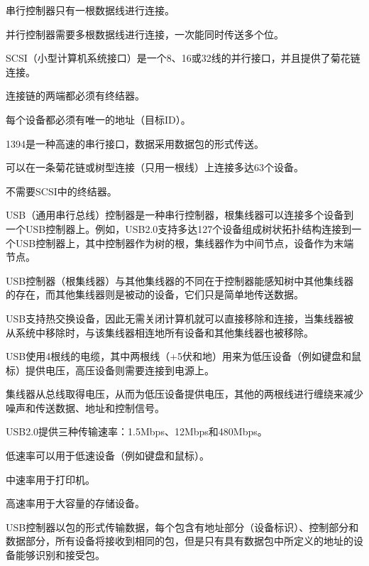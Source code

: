 \begin{compactitem}
\item 串行控制器只有一根数据线进行连接。
\item 并行控制器需要多根数据线进行连接，一次能同时传送多个位。
\end{compactitem}

SCSI（小型计算机系统接口）是一个8、16或32线的并行接口，并且提供了菊花链连接。

\begin{compactitem}
\item 连接链的两端都必须有终结器。
\item 每个设备都必须有唯一的地址（目标ID）。
\end{compactitem}

1394是一种高速的串行接口，数据采用数据包的形式传送。

\begin{compactitem}
\item 可以在一条菊花链或树型连接（只用一根线）上连接多达63个设备。
\item 不需要SCSI中的终结器。
\end{compactitem}

USB（通用串行总线）控制器是一种串行控制器，根集线器可以连接多个设备到一个USB控制器上。例如，USB2.0支持多达127个设备组成树状拓扑结构连接到一个USB控制器上，其中控制器作为树的根，集线器作为中间节点，设备作为末端节点。

USB控制器（根集线器）与其他集线器的不同在于控制器能感知树中其他集线器的存在，而其他集线器则是被动的设备，它们只是简单地传送数据。

USB支持热交换设备，因此无需关闭计算机就可以直接移除和连接，当集线器被从系统中移除时，与该集线器相连地所有设备和其他集线器也被移除。

USB使用4根线的电缆，其中两根线（+5伏和地）用来为低压设备（例如键盘和鼠标）提供电压，高压设备则需要连接到电源上。

集线器从总线取得电压，从而为低压设备提供电压，其他的两根线进行缠绕来减少噪声和传送数据、地址和控制信号。

USB2.0提供三种传输速率：1.5Mbps、12Mbps和480Mbps。

\begin{compactitem}
\item 低速率可以用于低速设备（例如键盘和鼠标）。
\item 中速率用于打印机。
\item 高速率用于大容量的存储设备。
\end{compactitem}

USB控制器以包的形式传输数据，每个包含有地址部分（设备标识）、控制部分和数据部分，所有设备将接收到相同的包，但是只有具有数据包中所定义的地址的设备能够识别和接受包。

